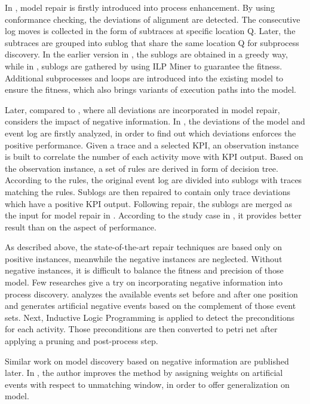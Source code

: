 In \cite{fahland2012repairing}, model repair is firstly introduced into process enhancement. By using conformance checking, the deviations of alignment are detected. The consecutive log moves is collected in the form of subtraces at specific location Q. Later, the subtraces are grouped into sublog that share the same location Q for subprocess discovery. In the earlier version in \cite{fahland2012repairing}, the sublogs are obtained in a greedy way, while in \cite{fahland2015model}, sublogs are gathered by using ILP Miner to guarantee the fitness. Additional subprocesses and loops are introduced into the existing model to ensure the fitness, which also brings variants of execution paths into the model. 

Later, compared to \cite{fahland2012repairing, fahland2015model}, where all deviations are incorporated in model repair, \cite{dees2017enhancing} considers the impact of negative information.  In \cite{dees2017enhancing}, the deviations of the model and event log are firstly analyzed, in order to find out which deviations enforces the positive performance. Given a trace and a selected KPI, an observation instance is built to correlate the number of each activity move with KPI output. Based on the observation instance,  a set of rules are derived in form of decision tree. According to the rules, the original event log are divided into sublogs with traces matching the rules. Sublogs are then repaired to contain only trace deviations which have a positive KPI output. Following repair, the sublogs are merged as the input for model repair in \cite{fahland2015model}. According to the study case in \cite{dees2017enhancing}, it provides better result than \cite{fahland2015model} on the aspect of performance. 
 
As described above, the state-of-the-art repair techniques are based only on positive instances, meanwhile the negative instances are neglected. Without negative instances, it is difficult to balance the fitness and precision of those model. Few researches give a try on incorporating negative information into process discovery. \cite{goedertier2009robust}  analyzes the available events set before and after one position and generates artificial negative events based on the complement of those event sets. Next, Inductive Logic Programming is applied to detect the preconditions for each activity. Those preconditions are then converted to petri net after applying a pruning and post-process step. 

Similar work on model discovery based on negative information are published later. In \cite{vanden2014determining}, the author improves the method by assigning weights on artificial events with respect to unmatching window, in order to offer generalization on model. 

